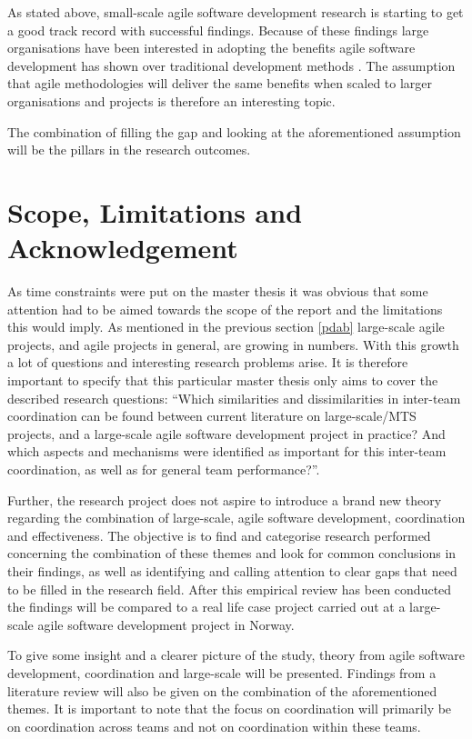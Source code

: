 As stated above, small-scale agile software development research is starting to get a good track record with successful findings. Because of these findings large organisations have been interested in adopting the benefits agile software development has shown over traditional development methods \cite{Com2013, Vlietland2015, Agerfalk2006, Paasivaara2012}. The assumption that agile methodologies will deliver the same benefits when scaled to larger organisations and projects is therefore an interesting topic.

The combination of filling the gap and looking at the aforementioned assumption will be the pillars in the research outcomes.

\section{Scope, Limitations and Acknowledgement}

As time constraints were put on the master thesis it was obvious that some attention had to be aimed towards the scope of the report and the limitations this would imply. As mentioned in the previous section \ref{pdab} large-scale agile projects, and agile projects in general, are growing in numbers. With this growth a lot of questions and interesting research problems arise. It is therefore important to specify that this particular master thesis only aims to cover the described research questions: ``Which similarities and dissimilarities in inter-team coordination can be found between current literature on large-scale/MTS projects, and a large-scale agile software development project in practice? And which aspects and mechanisms were identified as important for this inter-team coordination, as well as for general team performance?''.

Further, the research project does not aspire to introduce a brand new theory regarding the combination of large-scale, agile software development, coordination and effectiveness. The objective is to find and categorise research performed concerning the combination of these themes and look for common conclusions in their findings, as well as identifying and calling attention to clear gaps that need to be filled in the research field. After this empirical review has been conducted the findings will be compared to a real life case project carried out at a large-scale agile software development project in Norway.

To give some insight and a clearer picture of the study, theory from agile software development, coordination and large-scale will be presented. Findings from a literature review will also be given on the combination of the aforementioned themes. It is important to note that the focus on coordination will primarily be on coordination across teams and not on coordination within these teams.

